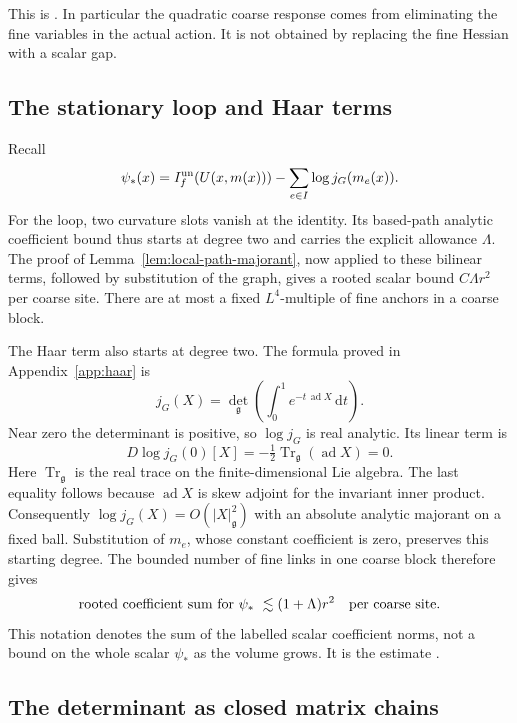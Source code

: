 \documentclass[11pt,reqno]{amsart}
\numberwithin{equation}{section}
\theoremstyle{definition}
\theoremstyle{remark}
\newcommand{\dd}{\mathrm d}
\newcommand{\g}{\mathfrak g}
\DeclareMathOperator{\ad}{ad}
\begin{document}
This is \cite[Proposition~16.4 and (16.9)--(16.10),
p.~82]{Main}. In particular the quadratic coarse
response comes from eliminating the fine variables
in the actual action. It is not obtained by
replacing the fine Hessian with a scalar gap.

\subsection{The stationary loop and Haar terms}

Recall
\[
 \psi_*(x)=I_f^{\rm un}(U(x,m(x)))
                  -\sum_{e\in I}\log j_G(m_e(x)).
\]
For the loop, two curvature slots vanish at the
identity. Its based-path analytic coefficient
bound thus starts at degree two and carries
the explicit allowance \(\Lambda\).
The proof of Lemma~\ref{lem:local-path-majorant},
now applied to these bilinear terms, followed by
substitution of the graph, gives a rooted scalar
bound \(C\Lambda r^2\) per coarse site.
There are at most a fixed \(L^4\)-multiple of fine
anchors in a coarse block.

The Haar term also starts at degree two.
The formula proved in Appendix~\ref{app:haar} is
\[
 j_G(X)=\det_{\g}\left(\int_0^1
                         e^{-t\,\ad X}\,\dd t\right).
\]
Near zero the determinant is positive, so
\(\log j_G\) is real analytic.
Its linear term is
\[
       D\log j_G(0)[X]=-\tfrac12
                                  \operatorname{Tr}_{\g}(\ad X)=0 .
\]
Here \(\operatorname{Tr}_{\g}\) is the real trace
on the finite-dimensional Lie algebra.
The last equality follows because \(\ad X\)
is skew adjoint for the invariant inner product.
Consequently \(\log j_G(X)=O(|X|_{\g}^2)\)
with an absolute analytic majorant on a fixed ball.
Substitution of \(m_e\), whose constant
coefficient is zero, preserves this starting degree.
The bounded number of fine links in one coarse block
therefore gives
\begin{equation}
   \text{rooted coefficient sum for }\psi_*
                         \ \lesssim(1+\Lambda)r^2
                         \quad\hbox{per coarse site}.
 \label{eq:local-loop-haar-majorant}
\end{equation}
This notation denotes the sum of the labelled scalar
coefficient norms, not a bound on the whole scalar
\(\psi_*\) as the volume grows.
It is the estimate \cite[(16.12), p.~83]{Main}.

\subsection{The determinant as closed matrix chains}
\end{document}
